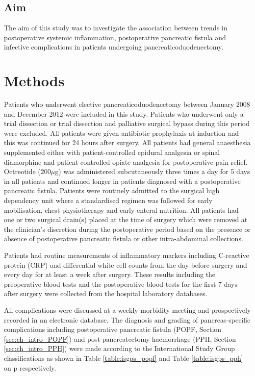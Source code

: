 \subsection{Aim}
The aim of this study was to investigate the association between trends in postoperative systemic inflammation, postoperative pancreatic fistula and infective complications in patients undergoing pancreaticoduodenectomy.

\clearpage
\section{Methods}

Patients who underwent elective pancreaticoduodenectomy between January 2008 and December 2012 were included in this study. 
Patients who underwent only a trial dissection or trial dissection and palliative surgical bypass during this period were excluded. 
All patients were given antibiotic prophylaxis at induction and this was continued for 24 hours after surgery. 
All patients had general anaesthesia supplemented either with patient-controlled epidural analgesia or spinal diamorphine and patient-controlled opiate analgesia for postoperative pain relief. 
Octreotide (200$\mu$g) was administered subcutaneously three times a day for 5 days in all patients and continued longer in patients diagnosed with a postoperative pancreatic fistula. 
Patients were routinely admitted to the surgical high dependency unit where a standardised regimen was followed for early mobilisation, chest physiotherapy and early enteral nutrition. 
All patients had one or two surgical drain(s) placed at the time of surgery which were removed at the clinician's discretion during the postoperative period based on the presence or absence of postoperative pancreatic fistula or other intra-abdominal collections. 

Patients had routine measurements of inflammatory markers including C-reactive protein (CRP) and differential white cell counts from the day before surgery and every day for at least a week after surgery. 
These results including the preoperative blood tests and the postoperative blood tests for the first 7 days after surgery were collected from the hospital laboratory databases.

All complications were discussed at a weekly morbidity meeting and prospectively recorded in an electronic database.  The diagnosis and grading of pancreas-specific complications including postoperative pancreatic fistula (POPF, Section \ref{sec:ch_intro_POPF}) and post-pancreatectomy haemorrhage (PPH, Section \ref{sec:ch_intro_PPH}) were made according to the International Study Group classifications as shown in Table \ref{table:isgps_popf} and Table \ref{table:isgps_pph} on p\pageref{table:isgps_popf} respectively.

